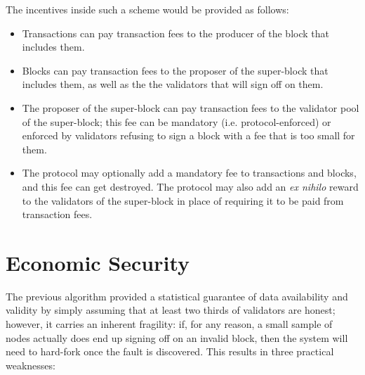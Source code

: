\documentclass[11pt,a4paper]{article}
\makeatletter
\theoremstyle{plain}
\theoremstyle{definition}
\theoremstyle{remark}
\newcommand{\ie}{i.e.\@\xspace}
\makeatother
\begin{document}
The incentives inside such a scheme would be provided as follows:

\begin{itemize}
\item
Transactions can pay transaction fees to the producer of the block that includes them.
\item
Blocks can pay transaction fees to the proposer of the super-block that includes them, as well as the the validators that will sign off on them.
\item
The proposer of the super-block can pay transaction fees to the validator pool of the super-block; this fee can be mandatory (\ie protocol-enforced) or enforced by validators refusing to sign a block with a fee that is too small for them.
\item
The protocol may optionally add a mandatory fee to transactions and blocks, and this fee can get destroyed. The protocol may also add an \emph{ex nihilo} reward to the validators of the super-block in place of requiring it to be paid from transaction fees.
\end{itemize}

\section{Economic Security}

The previous algorithm provided a statistical guarantee of data availability and validity by simply assuming that at least two thirds of validators are honest; however, it carries an inherent fragility: if, for any reason, a small sample of nodes actually does end up signing off on an invalid block, then the system will need to hard-fork once the fault is discovered. This results in three practical weaknesses:
\end{document}
